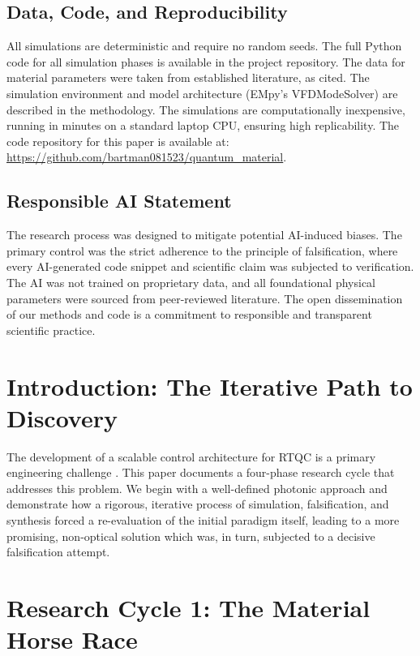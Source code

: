 \documentclass{article}
\begin{document}
\subsection{Data, Code, and Reproducibility}
All simulations are deterministic and require no random seeds. The full Python code for all simulation phases is available in the project repository. The data for material parameters were taken from established literature, as cited. The simulation environment and model architecture (EMpy's VFDModeSolver) are described in the methodology. The simulations are computationally inexpensive, running in minutes on a standard laptop CPU, ensuring high replicability. The code repository for this paper is available at: \href{https://github.com/bartman081523/quantum_material}{https://github.com/bartman081523/quantum\_material}.

\subsection{Responsible AI Statement}
The research process was designed to mitigate potential AI-induced biases. The primary control was the strict adherence to the principle of falsification, where every AI-generated code snippet and scientific claim was subjected to verification. The AI was not trained on proprietary data, and all foundational physical parameters were sourced from peer-reviewed literature. The open dissemination of our methods and code is a commitment to responsible and transparent scientific practice.

\section{Introduction: The Iterative Path to Discovery}
The development of a scalable control architecture for RTQC is a primary engineering challenge \cite{TFLNreview}. This paper documents a four-phase research cycle that addresses this problem. We begin with a well-defined photonic approach and demonstrate how a rigorous, iterative process of simulation, falsification, and synthesis forced a re-evaluation of the initial paradigm itself, leading to a more promising, non-optical solution which was, in turn, subjected to a decisive falsification attempt.

\section{Research Cycle 1: The Material Horse Race}
\end{document}
